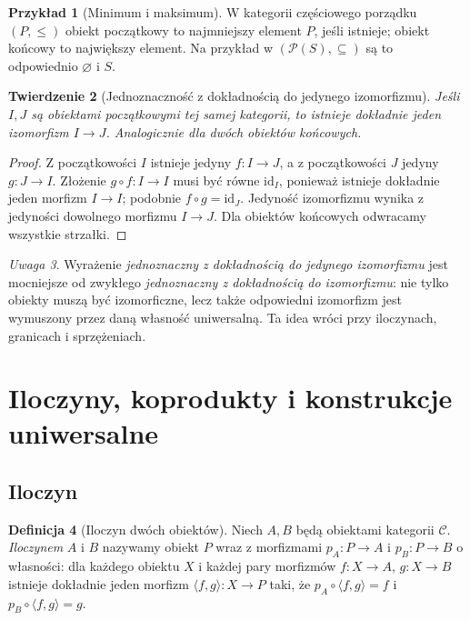 \documentclass[11pt,a4paper]{article}
\numberwithin{equation}{section}
\theoremstyle{plain}
\newtheorem{twierdzenie}{Twierdzenie}[section]
\theoremstyle{definition}
\newtheorem{definicja}[twierdzenie]{Definicja}
\newtheorem{przyklad}[twierdzenie]{Przykład}
\theoremstyle{remark}
\newtheorem{uwaga}[twierdzenie]{Uwaga}
\newcommand{\id}{\mathrm{id}}
\begin{document}
\begin{przyklad}[Minimum i maksimum]
W kategorii częściowego porządku $(P,\leq)$ obiekt początkowy to najmniejszy element $P$, jeśli istnieje; obiekt końcowy to największy element. Na przykład w $(\mathcal P(S),\subseteq)$ są to odpowiednio $\varnothing$ i $S$.
\end{przyklad}

\begin{twierdzenie}[Jednoznaczność z dokładnością do jedynego izomorfizmu]\label{tw:unique-universal}
Jeśli $I,J$ są obiektami początkowymi tej samej kategorii, to istnieje dokładnie jeden izomorfizm $I\to J$. Analogicznie dla dwóch obiektów końcowych.
\end{twierdzenie}
\begin{proof}
Z początkowości $I$ istnieje jedyny $f:I\to J$, a z początkowości $J$ jedyny $g:J\to I$. Złożenie $g\circ f:I\to I$ musi być równe $\id_I$, ponieważ istnieje dokładnie jeden morfizm $I\to I$; podobnie $f\circ g=\id_J$. Jedyność izomorfizmu wynika z jedyności dowolnego morfizmu $I\to J$. Dla obiektów końcowych odwracamy wszystkie strzałki.
\end{proof}

\begin{uwaga}
Wyrażenie \emph{jednoznaczny z dokładnością do jedynego izomorfizmu} jest mocniejsze od zwykłego \emph{jednoznaczny z dokładnością do izomorfizmu}: nie tylko obiekty muszą być izomorficzne, lecz także odpowiedni izomorfizm jest wymuszony przez daną własność uniwersalną. Ta idea wróci przy iloczynach, granicach i sprzężeniach.
\end{uwaga}





\section{Iloczyny, koprodukty i konstrukcje uniwersalne}\label{sec:produkty}

\subsection{Iloczyn}

\begin{definicja}[Iloczyn dwóch obiektów]\label{def:produkt}
Niech $A,B$ będą obiektami kategorii $\mathcal C$. \emph{Iloczynem} $A$ i $B$ nazywamy obiekt $P$ wraz z morfizmami $p_A:P\to A$ i $p_B:P\to B$ o własności: dla każdego obiektu $X$ i każdej pary morfizmów $f:X\to A$, $g:X\to B$ istnieje dokładnie jeden morfizm $\langle f,g\rangle:X\to P$ taki, że $p_A\circ\langle f,g\rangle=f$ i $p_B\circ\langle f,g\rangle=g$.
\end{definicja}
\end{document}
